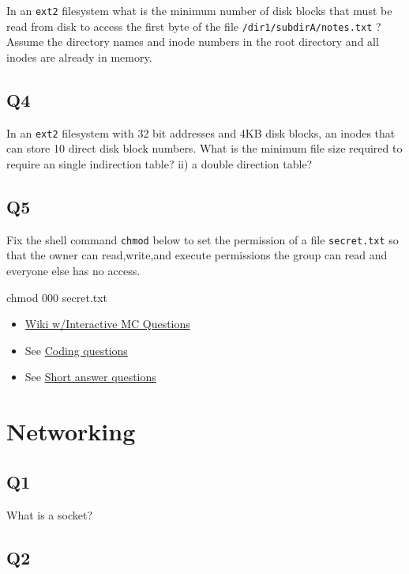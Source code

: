 In an \texttt{ext2} filesystem what is the minimum number of disk blocks that must be read from disk to access the first byte of the file \texttt{/dir1/subdirA/notes.txt} ? Assume the directory names and inode numbers in the root directory and all inodes are already in memory.

\subsection{Q4}\label{q4-3}

In an \texttt{ext2} filesystem with 32 bit addresses and 4KB disk blocks, an inodes that can store 10 direct disk block numbers. What is the minimum file size required to require an single indirection table? ii) a double direction table?

\subsection{Q5}\label{q5-2}

Fix the shell command \texttt{chmod} below to set the permission of a file \texttt{secret.txt} so that the owner can read,write,and execute permissions the group can read and everyone else has no access.

\begin{code}[language=C]
chmod 000 secret.txt
\end{code}

\begin{itemize}
\tightlist
\item
  \href{http://angrave.github.io/SystemProgramming/networkingreviewquestions.html}{Wiki w/Interactive MC Questions}
\item
  See \protect\hyperlink{coding-questions}{Coding questions}
\item
  See \protect\hyperlink{short-answer-questions}{Short answer questions}
\end{itemize}

\section{Networking}

\subsection{Q1}\label{q1-5}

What is a socket?

\subsection{Q2}\label{q2-5}

